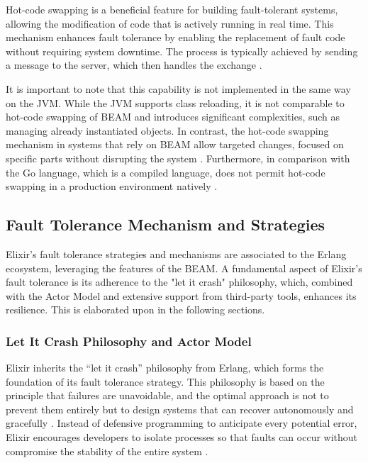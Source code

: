 Hot-code swapping is a beneficial feature for building fault-tolerant systems, allowing the modification of code that is actively running in real time. This mechanism enhances fault tolerance by enabling the replacement of fault code without requiring system downtime. The process is typically achieved by sending a message to the server, which then handles the exchange \cite{Armstrong2013}.

It is important to note that this capability is not implemented in the same way on the \gls{JVM}. While the \gls{JVM} supports class reloading, it is not comparable to hot-code swapping of \gls{BEAM} and introduces significant complexities, such as managing already instantiated objects. In contrast, the hot-code swapping mechanism in systems that rely on \gls{BEAM} allow targeted changes, focused on specific parts without disrupting the system \cite{erlang-concurrency-blog}. Furthermore, in comparison with the Go language, which is a compiled language, does not permit hot-code swapping in a production environment natively \cite{go-docs}.

\subsection{Fault Tolerance Mechanism and Strategies}

Elixir's fault tolerance strategies and mechanisms are associated to the Erlang ecosystem, leveraging the features of the \gls{BEAM}. A fundamental aspect of Elixir's fault tolerance is its adherence to the "let it crash" philosophy, which, combined with the Actor Model and extensive support from third-party tools, enhances its resilience. This is elaborated upon in the following sections.

\subsubsection{Let It Crash Philosophy and Actor Model}

Elixir inherits the “let it crash” philosophy from Erlang, which forms the foundation of its fault tolerance strategy. This philosophy is based on the principle that failures are unavoidable, and the optimal approach is not to prevent them entirely but to design systems that can recover autonomously and gracefully \cite{Armstrong2013, Kleppmann2017}. Instead of defensive programming to anticipate every potential error, Elixir encourages developers to isolate processes so that faults can occur without compromise the stability of the entire system \cite{Juric2024}.

